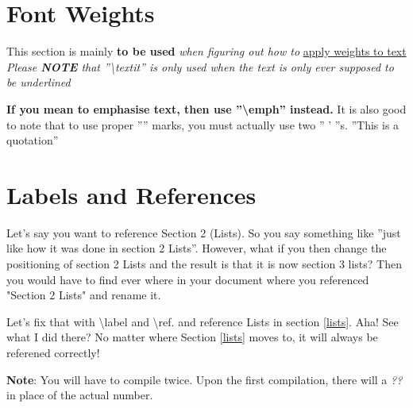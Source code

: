 \documentclass{article}
\author{Tyler Ryan}
\title{\booktitle}
\date{January 31, 2023}                             %
\newcommand\booktitle{\LaTeX: A Basic Overview}     %
\newcommand\red[1]{{\color{red} #1}}                %
\newcommand\ns[1]{\section*{#1}}                    %
\begin{document}
\pagestyle{fancy}
\fancyhead{}
\fancyhead[REO]{\booktitle}                         %
\fancyfoot{}
\fancyfoot[REO]{\thepage}
\maketitle
\tableofcontents
\newpage

\section{Font Weights}
This section is mainly \textbf{to be used}
\textit{when figuring out how to} \underline{apply weights to text}
\emph{Please \textbf{NOTE} that ''\textbackslash textit'' is only used
when the text is only ever supposed to be underlined} 

\noindent
\textbf{If you mean to emphasise text, then use ''\textbackslash emph''
instead.} 
It is also good to note that to use proper '''' marks, you must actually
use two '' ' ''s.
''This is a quotation''

\ns{Labels and References}                                    %
\red{Let's say you want to reference Section 2 (Lists).} 
So you say something like ''just like how it was done in 
section 2 Lists''. However, what if you then change the 
positioning of section 2 Lists and the result is that it 
is now section 3 lists? Then you would have to find ever where
in your document where you referenced "Section 2 Lists" and 
rename it.

\noindent
Let's fix that with \textbackslash label and \textbackslash ref.
and reference Lists in section \ref{lists}. Aha! See what I did
there? No matter where Section \ref{lists} moves to, it 
will always be referened correctly!

\noindent
\textbf{Note}: You will have to compile twice. Upon the first
compilation, there will a \emph{??} in place of the actual 
number.                                                             
\end{document}
